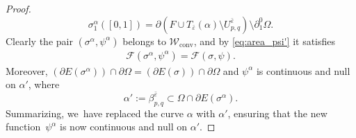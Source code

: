 \documentclass[11pt]{article}
\numberwithin{equation}{section}
\let\eps\varepsilon
\let\Om\Omega
\newcommand\admclassconv{{\mathcal W_\mathrm{conv}}}
\theoremstyle{definition}
\begin{document}
\begin{proof}
\begin{equation*}
\sigma^\alpha_{1}([0,1])= \partial (F\cup T_{\bar\eps}(\alpha)\setminus U^{\bar{\eps}}_{p,q})\setminus\partial_1^0\Om.
\end{equation*}
Clearly the pair $(\sigma^\alpha,\psi^\alpha)$ belongs to $\admclassconv$, and by \eqref{eq:area_psi'} it satisfies
\begin{equation*}
\begin{split}
{\mathcal F}(\sigma^\alpha,\psi^\alpha)=
{\mathcal F}(\sigma, \psi).
\end{split}
\end{equation*}
Moreover,
$
(\partial E(\sigma^\alpha))\cap\partial\Om=(\partial E(\sigma))\cap\partial\Om$ and $\psi^\alpha$ is continuous and null on $\alpha'$, where
\begin{equation}\label{gamma'}
\alpha':=\beta_{p,q}^{\bar\eps}\subset \Om\cap\partial E(\sigma^\alpha).
\end{equation}
Summarizing, we~have replaced the curve $\alpha$ with $\alpha'$, ensuring that the new function~$\psi^\alpha$ is now continuous and null on $\alpha'$.


\end{proof}
\end{document}
